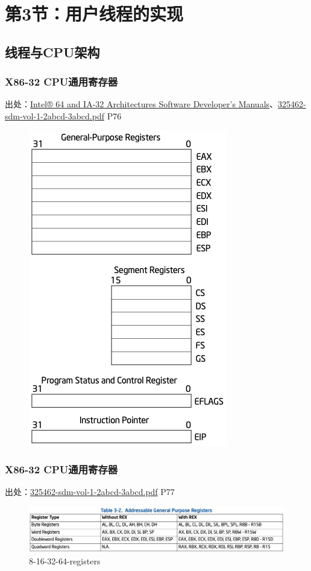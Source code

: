 \section{第3节：用户线程的实现}%
% 
\subsection{线程与CPU架构}
% 
\begin{frame}[fragile]
    \frametitle{X86-32 CPU通用寄存器}
% 
% 
% 
出处：\href{https://software.intel.com/content/www/us/en/develop/articles/intel-sdm.html\#combined}{Intel® 64 and IA-32 Architectures Software Developer’s Manuals}、\href{https://software.intel.com/content/dam/develop/external/us/en/documents-tps/325462-sdm-vol-1-2abcd-3abcd.pdf}{325462-sdm-vol-1-2abcd-3abcd.pdf} P76
% 
	\begin{figure}
		\centering
		\includegraphics[width=0.25\linewidth]{figs/x86-32-registers.png}
	\end{figure}


% 
\end{frame}
\begin{frame}[fragile]
    \frametitle{X86-32 CPU通用寄存器}
% 
出处：\href{https://software.intel.com/content/dam/develop/external/us/en/documents-tps/325462-sdm-vol-1-2abcd-3abcd.pdf}{325462-sdm-vol-1-2abcd-3abcd.pdf} P77
% 
	\begin{figure}
		\centering
		\includegraphics[width=1.0\linewidth]{figs/8-16-32-64-registers.png}
		\caption{8-16-32-64-registers}
	\end{figure}


% 
\end{frame}
